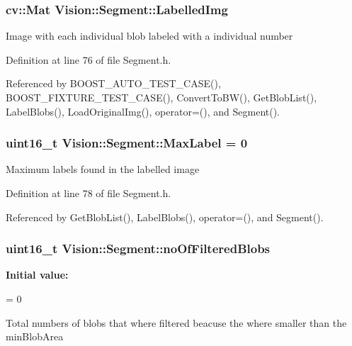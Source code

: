 \subsubsection[{Labelled\+Img}]{\setlength{\rightskip}{0pt plus 5cm}cv\+::\+Mat Vision\+::\+Segment\+::\+Labelled\+Img}\label{class_vision_1_1_segment_a4daa143f6cd4a753d3bbe45c6a67d27f}
Image with each individual blob labeled with a individual number 

Definition at line 76 of file Segment.\+h.



Referenced by B\+O\+O\+S\+T\+\_\+\+A\+U\+T\+O\+\_\+\+T\+E\+S\+T\+\_\+\+C\+A\+S\+E(), B\+O\+O\+S\+T\+\_\+\+F\+I\+X\+T\+U\+R\+E\+\_\+\+T\+E\+S\+T\+\_\+\+C\+A\+S\+E(), Convert\+To\+B\+W(), Get\+Blob\+List(), Label\+Blobs(), Load\+Original\+Img(), operator=(), and Segment().

\hypertarget{class_vision_1_1_segment_a22d2a688de65f4d25b164f8b2a03f4a9}{}
\subsubsection[{Max\+Label}]{\setlength{\rightskip}{0pt plus 5cm}uint16\+\_\+t Vision\+::\+Segment\+::\+Max\+Label = 0}\label{class_vision_1_1_segment_a22d2a688de65f4d25b164f8b2a03f4a9}
Maximum labels found in the labelled image 

Definition at line 78 of file Segment.\+h.



Referenced by Get\+Blob\+List(), Label\+Blobs(), operator=(), and Segment().

\hypertarget{class_vision_1_1_segment_a97077da3a144e800073bc06f5d4722d4}{}
\subsubsection[{no\+Of\+Filtered\+Blobs}]{\setlength{\rightskip}{0pt plus 5cm}uint16\+\_\+t Vision\+::\+Segment\+::no\+Of\+Filtered\+Blobs}\label{class_vision_1_1_segment_a97077da3a144e800073bc06f5d4722d4}
{\bfseries Initial value\+:}
\begin{DoxyCode}
=
      0
\end{DoxyCode}
Total numbers of blobs that where filtered beacuse the where smaller than the min\+Blob\+Area 

